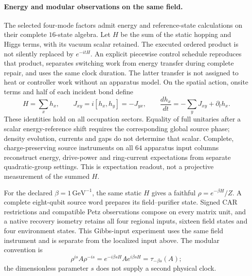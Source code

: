 \paragraph{Energy and modular observations on the same field.}
The selected four-mode factors admit energy and reference-state
calculations on their complete $16$-state algebra. Let $H$ be the sum of
the static hopping and Higgs terms, with its vacuum scalar retained.
The executed ordered product is not silently replaced by $e^{-itH}$.
An explicit piecewise control schedule reproduces that product, separates
switching work from energy transfer during complete repair, and uses the
same clock duration. The latter transfer is not assigned to heat or
controller work without an apparatus model. On the spatial action,
onsite terms and half of each incident bond define
\[
 H=\sum_x h_x,\qquad J_{xy}=i[h_x,h_y]=-J_{yx},\qquad
 \frac{dh_x}{dt}=-\sum_yJ_{xy}+\partial_t h_x.
\]
These identities hold on all occupation sectors. Equality of full unitaries
after a scalar energy-reference shift requires the corresponding global
source phase; density evolution, currents and gaps do not determine that
scalar.
Complete, charge-preserving source instruments on all $64$ apparatus input
columns reconstruct energy, drive-power and ring-current expectations from
separate quadratic-group settings. This is expectation readout, not a
projective measurement of the summed $H$.

For the declared $\beta=1\,\mathrm{GeV}^{-1}$, the same static $H$ gives a
faithful $\rho=e^{-\beta H}/Z$. A complete eight-qubit source word prepares
its field--purifier state. Signed CAR restrictions and compatible Petz
observations compose on every matrix unit, and a native recovery isometry
retains all four regional inputs, sixteen field states and four environment
states. This Gibbs-input experiment uses the same field
instrument and is separate from the localized input above. The modular
convention is
\[
 \rho^{is}A\rho^{-is}=e^{-i\beta sH}Ae^{i\beta sH}=\tau_{-\beta s}(A);
\]
the dimensionless parameter $s$ does not supply a second physical clock.

